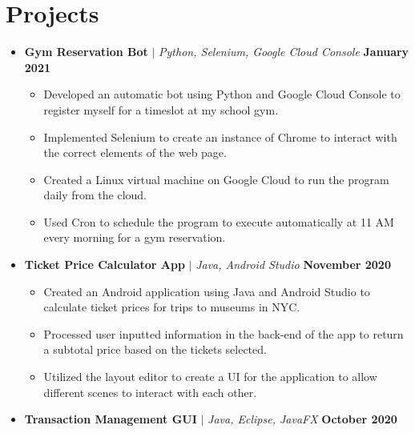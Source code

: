 \documentclass[letterpaper,5pt]{article}
\newcommand{\smalltextbullet}{\,\begin{picture}(-1,1)(-1,-3)\circle*{3}\end{picture}\ }
\begin{document}
    
    \section{\textbf{Projects}}
    \begin{itemize}[leftmargin=0in, label={}]
        \item[]
            \textbf{Gym Reservation Bot} $|$ \emph{Python, Selenium, Google Cloud Console} \hfill \textbf{January 2021}
            \begin{itemize}
                \vspace*{-2mm}
                \item[\smalltextbullet] Developed an automatic bot using Python and Google Cloud Console to register myself for a timeslot at my school gym.
                \item[\smalltextbullet] Implemented Selenium to create an instance of Chrome to interact with the correct elements of the web page.
                \item[\smalltextbullet] Created a Linux virtual machine on Google Cloud to run the program daily from the cloud.
                \item[\smalltextbullet] Used Cron to schedule the program to execute automatically at 11 AM every morning for a gym reservation.
            \end{itemize}
            \vspace{-3mm}
        \item[]
            \textbf{Ticket Price Calculator App} $|$ \emph{Java, Android Studio} \hfill \textbf{November 2020}
            \begin{itemize}
                \vspace*{-2mm}
                \item[\smalltextbullet] Created an Android application using Java and Android Studio to calculate ticket prices for trips to museums in NYC.
                \item[\smalltextbullet] Processed user inputted information in the back-end of the app to return a subtotal price based on the tickets selected.
                \item[\smalltextbullet] Utilized the layout editor to create a UI for the application to allow different scenes to interact with each other.
            \end{itemize}
            \vspace{-3mm}
        \item[]
            \textbf{Transaction Management GUI} $|$ \emph{Java, Eclipse, JavaFX} \hfill \textbf{October 2020}

\end{itemize}
\end{document}
